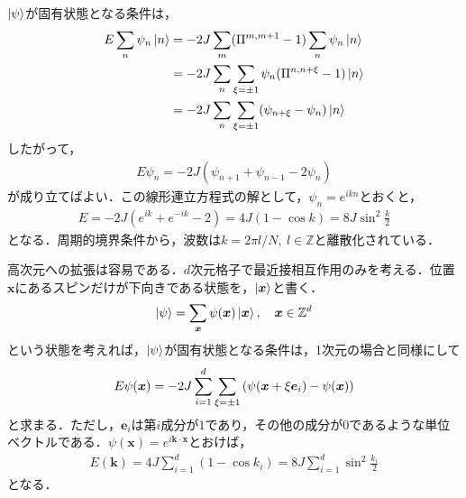 \documentclass[dvipdfmx,9pt]{beamer}
\numberwithin{equation}{section}
\begin{document}
\begin{frame}
    $\ket{\psi}$が固有状態となる条件は，
    \begin{align}
        \nonumber
        E \sum_n \psi_n \ket{n} &= -2J \sum_m(\Pi^{m,m+1}-1)\sum_n \psi_n\ket{n}
        \\ & \nonumber
        = -2J \sum_n \sum_{\xi= \pm1} \psi_n (\Pi^{n,n+\xi}-1)\ket{n}
        \\ &
        = -2J \sum_n \sum_{\xi=\pm 1}(\psi_{n+\xi}-\psi_n)\ket{n}
    \end{align}
    したがって，
    \begin{align}
        E\psi_n = -2J(\psi_{n+1}+\psi_{n-1}-2\psi_n)
    \end{align}
    が成り立てばよい．この線形連立方程式の解として，$\psi_n = e^{ikn}$とおくと，
    \begin{align}
        E = -2J(e^{ik} + e^{-ik}-2) = 4J(1-\cos k) = 8J \sin^2 \frac{k}{2}
    \end{align}
    となる．周期的境界条件から，波数は$k = 2\pi l/N,~ l \in \mathbb{Z}$と離散化されている．
\end{frame}

\begin{frame}
    高次元への拡張は容易である．$d$次元格子で最近接相互作用のみを考える．位置$\bm{x}$にあるスピンだけが下向きである状態を，$\ket{\bm{x}}$と書く．
    \begin{align}
        \ket{\psi} = \sum_{\bm{x}}\psi(\bm{x})\ket{\bm{x}}, \quad
        \bm{x}\in \mathbb{Z}^d
    \end{align}
    という状態を考えれば，$\ket{\psi}$が固有状態となる条件は，1次元の場合と同様にして
    \begin{gather}
        E\psi(\bm{x}) = -2J \sum_{i = 1}^d \sum_{\xi = \pm 1} \qty(\psi(\bm{x} + \xi\bm{e}_i) - \psi(\bm{x}))
        \label{Bloch theory: 1 spin wave condition}
    \end{gather}
    と求まる．ただし，$\bm{e}_i$は第$i$成分が$1$であり，その他の成分が$0$であるような単位ベクトルである．$\psi(\bm{x}) = e^{i\bm{k} \cdot \bm{x}}$とおけば，
    \begin{align}
        E(\bm{k}) = 4J \sum_{i=1}^d (1- \cos k_i) =
        8J \sum_{i=1}^d \sin^2 \frac{k_i}{2}
    \end{align}
    となる．
\end{frame}
\end{document}
